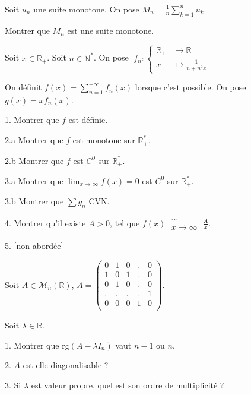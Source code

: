 \subetoiles



\noindent Soit $u_n$ une suite monotone.
On pose $\displaystyle M_n = \frac {1} {n} \sum_{k = 1}^{n} u_k$.

\vspace{5pt}
\noindent Montrer que $M_n$ est une suite monotone.



\subetoiles
\columnbreak



\noindent Soit $x \in \mathbb{R}_+$. Soit $n \in \mathbb{N}^*$.
\noindent On pose
$\; f_n :
\begin{cases}
  \mathbb{R}_+  & \longrightarrow \mathbb{R}\\    
  x & \longmapsto \displaystyle \frac {1} {n + n^2x}
\end{cases}
$

\noindent On définit $\displaystyle f(x) = \sum_{n=1}^{+\infty}f_n(x)$ lorsque c'est possible.
\noindent On pose $g(x) = xf_n(x)$.

\vspace{5pt}
1. Montrer que $f$ est définie.

\vspace{5pt}
2.a Montrer que $f$ est monotone sur $\mathbb{R}_+^*$.

\vspace{5pt}
2.b Montrer que $f$ est $C^0$ sur $\mathbb{R}_+^*$.

\vspace{5pt}
3.a Montrer que $\displaystyle \lim_{x\to\infty} f(x) = 0$ est $C^0$ sur $\mathbb{R}_+^*$.

\vspace{5pt}
3.b Montrer que $\sum g_n$ CVN.

\vspace{5pt}
4. Montrer qu'il existe $A > 0$, tel que $\displaystyle f(x) \; \substack{\sim \\ x\to\infty} \; \frac {A} {x}$.

\vspace{5pt}
5. [non abordée]




\subetoiles




\noindent Soit $A \in \mathcal{M}_n(\mathbb{R})$, $A =
\begin{pmatrix}
0 & 1 & 0 & . & 0 \\
1 & 0 & 1 & . & 0 \\
0 & 1 & 0 & . & 0 \\
. & . & . & . & 1 \\
0 & 0 & 0 & 1 & 0 \\
\end{pmatrix}
$.

\noindent Soit $\lambda \in \mathbb{R}$.

\vspace{5pt}
1. Montrer que $\mathrm{rg}(A-\lambda I_n)$ vaut $n-1$ ou $n$.

\vspace{5pt}
2. $A$ est-elle diagonalisable ?

\vspace{5pt}
3. Si $\lambda$ est valeur propre, quel est son ordre de multiplicité ?
